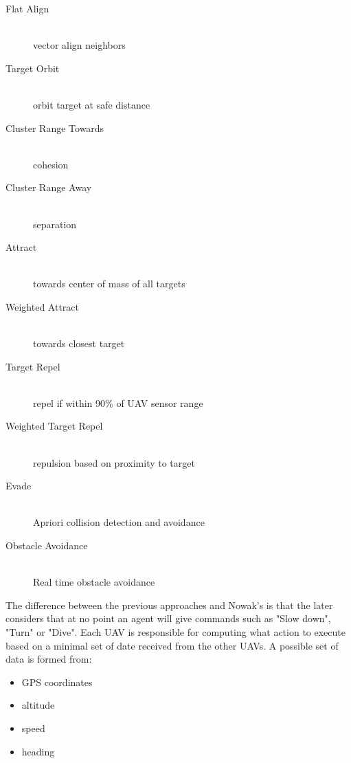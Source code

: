\begin{description}
\item [Flat Align] \hfill \\ vector align neighbors
\item [Target Orbit] \hfill \\ orbit target at safe distance
\item [Cluster Range Towards] \hfill \\ cohesion
\item [Cluster Range Away] \hfill \\ separation
\item [Attract] \hfill \\ towards center of mass of all targets
\item [Weighted Attract] \hfill \\ towards closest target
\item [Target Repel] \hfill \\ repel if within 90\% of UAV sensor range
\item [Weighted Target Repel] \hfill \\ repulsion based on proximity to target
\item [Evade] \hfill \\ Apriori collision detection and avoidance
\item [Obstacle Avoidance] \hfill \\ Real time obstacle avoidance
\end{description}

The difference between the previous approaches and Nowak's is that the later
considers that at no point an agent will give commands such as "Slow down", "Turn" or
"Dive". Each UAV is responsible for computing what action to execute based on 
a minimal set of date received from the other UAVs. A possible set of data
is formed from:
\begin{itemize}
\item GPS coordinates
\item altitude
\item speed
\item heading
\end{itemize}


